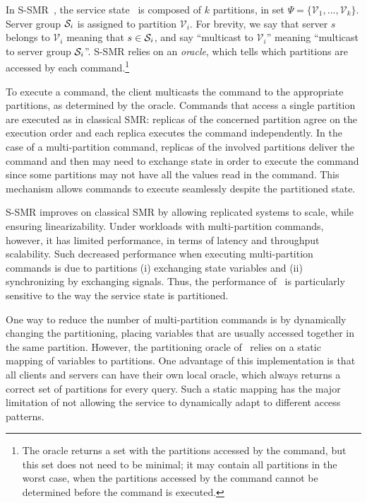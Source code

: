In S-SMR~\cite{bezerra2014ssmr}, the service state \vvt\ is composed of $k$
partitions, in set $\Psi = \{\mathcal{V}_1, ..., \mathcal{V}_k\}$. Server group
$\mathcal{S}_i$ is assigned to partition $\mathcal{V}_i$. For brevity, we say that
server $s$ belongs to $\mathcal{V}_i$ meaning that $s \in \mathcal{S}_i$, and say
``multicast to $\mathcal{V}_i$'' meaning ``multicast to server group $\mathcal{S}_i$''.
S-SMR relies on an \emph{oracle}, which tells which partitions are accessed by
each command.\footnote{The oracle returns a set with the partitions accessed
by the command, but this set does not need to be minimal; it may contain all
partitions in the worst case, when the partitions accessed by the command cannot
be determined before the command is executed.}


To execute a command, the client multicasts the command to the appropriate
partitions, as determined by the oracle. Commands that access a single partition
are executed as in classical SMR: replicas of the concerned partition agree on
the execution order and each replica executes the command independently. In the
case of a multi-partition command, replicas of the involved partitions deliver
the command and then may need to exchange state in order to execute the command
since some partitions may not have all the values read in the command. This
mechanism allows commands to execute seamlessly despite the partitioned state.

S-SMR improves on classical SMR by allowing replicated systems to scale, while
ensuring linearizability. Under workloads with multi-partition commands,
however, it has limited performance, in terms of latency and throughput
scalability. Such decreased performance when executing multi-partition commands
is due to partitions (i) exchanging state variables and (ii) synchronizing by
exchanging signals. Thus, the performance of \ssmr\ is particularly
sensitive to the way the service state is partitioned.

One way to reduce the number of multi-partition commands is by dynamically
changing the partitioning, placing variables that are usually accessed together
in the same partition. However, the partitioning oracle of \ssmr\ relies on a
static mapping of variables to partitions. One advantage of this implementation
is that all clients and servers can have their own local oracle, which always
returns a correct set of partitions for every query. Such a static mapping has
the major limitation of not allowing the service to dynamically adapt to
different access patterns.

